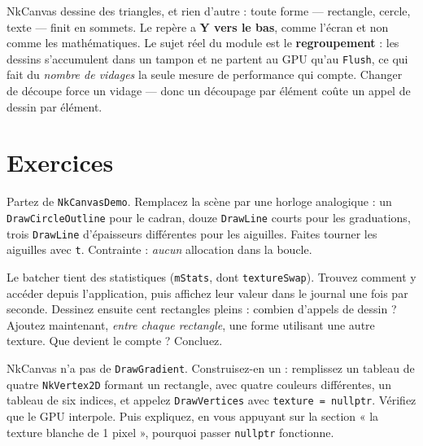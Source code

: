 \begin{nkbilan}
NkCanvas dessine des triangles, et rien d'autre : toute forme --- rectangle,
cercle, texte --- finit en sommets. Le repère a \textbf{Y vers le bas}, comme
l'écran et non comme les mathématiques. Le sujet réel du module est le
\textbf{regroupement} : les dessins s'accumulent dans un tampon et ne partent au
GPU qu'au \texttt{Flush}, ce qui fait du \emph{nombre de vidages} la seule
mesure de performance qui compte. Changer de découpe force un vidage --- donc un
découpage par élément coûte un appel de dessin par élément.
\end{nkbilan}

\section{Exercices}

\begin{nkpratique}
Partez de \texttt{NkCanvasDemo}. Remplacez la scène par une horloge analogique :
un \texttt{DrawCircleOutline} pour le cadran, douze \texttt{DrawLine} courts pour
les graduations, trois \texttt{DrawLine} d'épaisseurs différentes pour les
aiguilles. Faites tourner les aiguilles avec \texttt{t}. Contrainte : \emph{aucun}
allocation dans la boucle.
\end{nkpratique}

\begin{nkdemo}
Le batcher tient des statistiques (\texttt{mStats}, dont \texttt{textureSwap}).
Trouvez comment y accéder depuis l'application, puis affichez leur valeur dans le
journal une fois par seconde. Dessinez ensuite cent rectangles pleins :
combien d'appels de dessin ? Ajoutez maintenant, \emph{entre chaque rectangle},
une forme utilisant une autre texture. Que devient le compte ? Concluez.
\end{nkdemo}

\begin{nkpratique}
NkCanvas n'a pas de \texttt{DrawGradient}. Construisez-en un : remplissez un
tableau de quatre \texttt{NkVertex2D} formant un rectangle, avec quatre couleurs
différentes, un tableau de six indices, et appelez \texttt{DrawVertices} avec
\texttt{texture = nullptr}. Vérifiez que le GPU interpole. Puis expliquez, en
vous appuyant sur la section « la texture blanche de 1 pixel », pourquoi passer
\texttt{nullptr} fonctionne.
\end{nkpratique}

